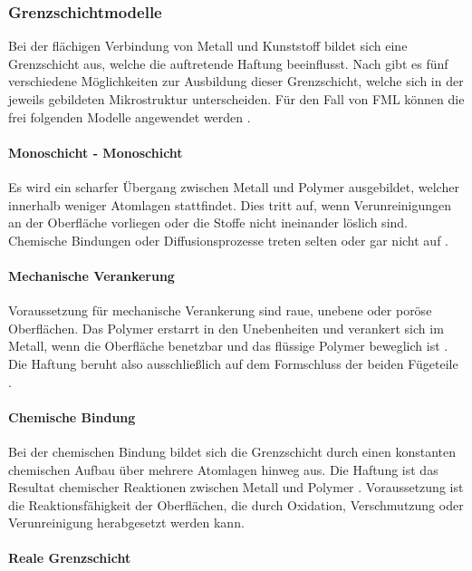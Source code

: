 \subsubsection{Grenzschichtmodelle}\label{sec:modelle}

Bei der flächigen Verbindung von Metall und Kunststoff bildet sich eine Grenzschicht aus, welche die auftretende Haftung beeinflusst. Nach \cite{Haefer.1987} gibt es fünf verschiedene Möglichkeiten zur Ausbildung dieser Grenzschicht, welche sich in der jeweils gebildeten Mikrostruktur unterscheiden. 
Für den Fall von FML können die frei folgenden Modelle angewendet werden \cite{Flock.2012}.

\paragraph{Monoschicht - Monoschicht}

Es wird ein scharfer Übergang zwischen Metall und Polymer ausgebildet, welcher innerhalb weniger Atomlagen stattfindet. Dies tritt auf, wenn Verunreinigungen an der Oberfläche vorliegen oder die Stoffe nicht ineinander löslich sind. Chemische Bindungen oder Diffusionsprozesse treten selten oder gar nicht auf \cite{Mann.1993,Haefer.1987}.

\paragraph{Mechanische Verankerung} 

Voraussetzung für mechanische Verankerung sind raue, unebene oder poröse Oberflächen. Das Polymer erstarrt in den Unebenheiten und verankert sich im Metall, wenn die Oberfläche benetzbar und das flüssige Polymer beweglich ist \cite{Haefer.1987}. Die Haftung beruht also ausschließlich auf dem Formschluss der beiden Fügeteile \cite{Flock.2012}.

\paragraph{Chemische Bindung}

Bei der chemischen Bindung bildet sich die Grenzschicht durch einen konstanten chemischen Aufbau über mehrere Atomlagen hinweg aus. Die Haftung ist das Resultat chemischer Reaktionen zwischen Metall und Polymer \cite{Haefer.1987}. Voraussetzung ist die Reaktionsfähigkeit der Oberflächen, die durch Oxidation, Verschmutzung oder Verunreinigung herabgesetzt werden kann.

\paragraph{Reale Grenzschicht}

